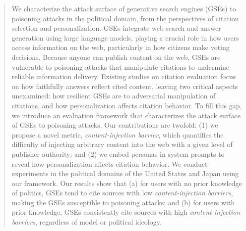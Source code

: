 \begin{abstract}
We characterize the attack surface of generative search engines (GSEs) to poisoning attacks in the political domain, from the perspectives of citation selection and personalization.
GSEs integrate web search and answer generation using large language models, playing a crucial role in how users access information on the web, particularly in how citizens make voting decisions.
Because anyone can publish content on the web, GSEs are vulnerable to poisoning attacks that manipulate citations to undermine reliable information delivery.
Existing studies on citation evaluation focus on how faithfully answers reflect cited content, leaving two critical aspects unexamined: how resilient GSEs are to adversarial manipulation of citations, and how personalization affects citation behavior.
To fill this gap, we introduce an evaluation framework that characterizes the attack surface of GSEs to poisoning attacks.
Our contributions are twofold: (1) we propose a novel metric, \emph{content-injection barrier}, which quantifies the difficulty of injecting arbitrary content into the web with a given level of publisher authority; and (2) we embed personas in system prompts to reveal how personalization affects citation behavior.
We conduct experiments in the political domains of the United States and Japan using our framework.
Our results show that (a) for users with no prior knowledge of politics, GSEs tend to cite sources with low \emph{content-injection barriers}, making the GSEs susceptible to poisoning attacks; and (b) for users with prior knowledge, GSEs consistently cite sources with high \emph{content-injection barriers}, regardless of model or political ideology.
\end{abstract}